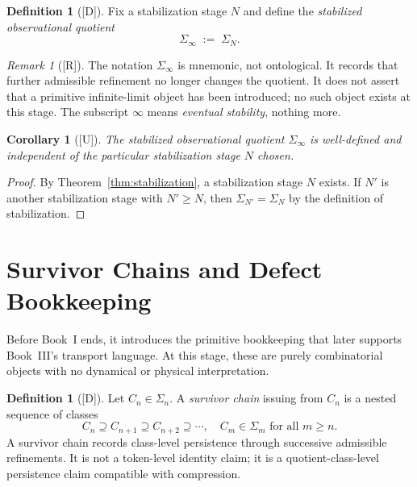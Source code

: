 \documentclass[12pt,oneside]{amsbook}
\theoremstyle{plain}
\newtheorem{corollary}[theorem]{Corollary}
\theoremstyle{definition}
\newtheorem{definition}[theorem]{Definition}
\theoremstyle{remark}
\newtheorem{remark}[theorem]{Remark}
\newcommand{\status}[1]{\textup{[#1]}}
\begin{document}
\begin{definition}[\status{D}]\label{def:stabilized-quotient}
Fix a stabilization stage $N$ and define the
\emph{stabilized observational quotient}
\[
  \Sigma_\infty \;:=\; \Sigma_N.
\]
\end{definition}

\begin{remark}[\status{R}]\label{rmk:sigma-infty}
The notation $\Sigma_\infty$ is mnemonic, not ontological.  It records
that further admissible refinement no longer changes the quotient.  It
does not assert that a primitive infinite-limit object has been
introduced; no such object exists at this stage.  The subscript
$\infty$ means \emph{eventual stability}, nothing more.
\end{remark}

\begin{corollary}[\status{U}]\label{cor:stabilized-welldef}
The stabilized observational quotient $\Sigma_\infty$ is well-defined
and independent of the particular stabilization stage $N$ chosen.
\end{corollary}

\begin{proof}
By Theorem~\ref{thm:stabilization}, a stabilization stage $N$ exists.
If $N'$ is another stabilization stage with $N' \geq N$, then
$\Sigma_{N'} = \Sigma_N$ by the definition of stabilization.
\end{proof}

\section{Survivor Chains and Defect Bookkeeping}

Before Book~I ends, it introduces the primitive bookkeeping that
later supports Book~III's transport language.  At this stage, these
are purely combinatorial objects with no dynamical or physical
interpretation.

\begin{definition}[\status{D}]\label{def:survivor-component}
Let $C_n \in \Sigma_n$.  A \emph{survivor chain} issuing from $C_n$
is a nested sequence of classes
\[
  C_n \supseteq C_{n+1} \supseteq C_{n+2} \supseteq \cdots,
  \quad C_m \in \Sigma_m \text{ for all } m \geq n.
\]
A survivor chain records class-level persistence through successive
admissible refinements.  It is not a token-level identity claim; it is
a quotient-class-level persistence claim compatible with compression.
\end{definition}
\end{document}
